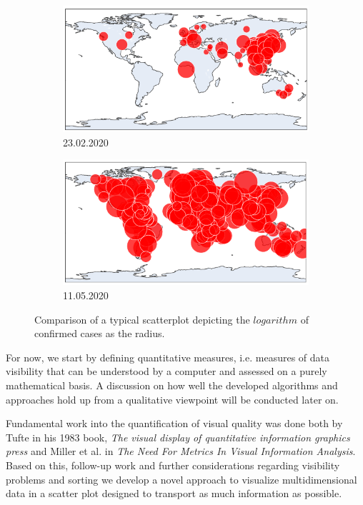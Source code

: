 \documentclass[a4paper,11pt]{article}
\begin{document}
%
\begin{figure}[h]
  \begin{subfigure}{0.5\textwidth}
    \includegraphics[width=0.9\linewidth]{covid_spread_20200223.png}
    \caption{23.02.2020}\label{fig:covid2020Feb}
  \end{subfigure}
  \begin{subfigure}{0.5\textwidth}
    \includegraphics[width=0.9\linewidth]{covid_spread_20200511.png}
    \caption{11.05.2020}\label{fig:covid2020May}
  \end{subfigure}
  \caption{Comparison of a typical scatterplot depicting the $logarithm$ of confirmed cases as the radius.}
  \label{fig:covid19}
\end{figure}
%

For now, we start by defining quantitative measures, i.e. measures of data visibility that can be understood by a computer and assessed on a purely mathematical basis. A discussion on how well the developed algorithms and approaches hold up from a qualitative viewpoint will be conducted later on.

Fundamental work into the quantification of visual quality was done both by Tufte in his 1983 book, \textit{The visual display of quantitative information graphics press} and Miller et al. in \textit{The Need For Metrics In Visual Information Analysis}. Based on this, follow-up work and further considerations regarding visibility problems and sorting we develop a novel approach to visualize multidimensional data in a scatter plot designed to transport as much information as possible.
\end{document}

